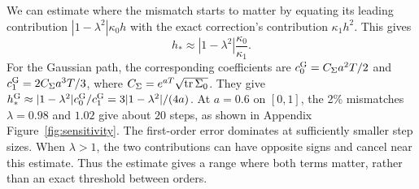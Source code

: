 We can estimate where the mismatch starts to matter by equating its leading contribution $|1-\lambda^2|\kappa_0h$ with the exact correction's contribution $\kappa_1h^2$. This gives
\[
 h_*\approx |1-\lambda^2|\frac{\kappa_0}{\kappa_1}.
\]
For the Gaussian path, the corresponding coefficients are $c_0^{\rm G}=C_\Sigma a^2T/2$ and $c_1^{\rm G}=2C_\Sigma a^3T/3$, where $C_\Sigma=e^{aT}\sqrt{\operatorname{tr}\Sigma_0}$. They give $h_*^{\rm G}\approx |1-\lambda^2|c_0^{\rm G}/c_1^{\rm G}=3|1-\lambda^2|/(4a)$. At $a=0.6$ on $[0,1]$, the 2\% mismatches $\lambda=0.98$ and $1.02$ give about $20$ steps, as shown in Appendix Figure~\ref{fig:sensitivity}. The first-order error dominates at sufficiently smaller step sizes. When $\lambda>1$, the two contributions can have opposite signs and cancel near this estimate. Thus the estimate gives a range where both terms matter, rather than an exact threshold between orders.

\FloatBarrier
